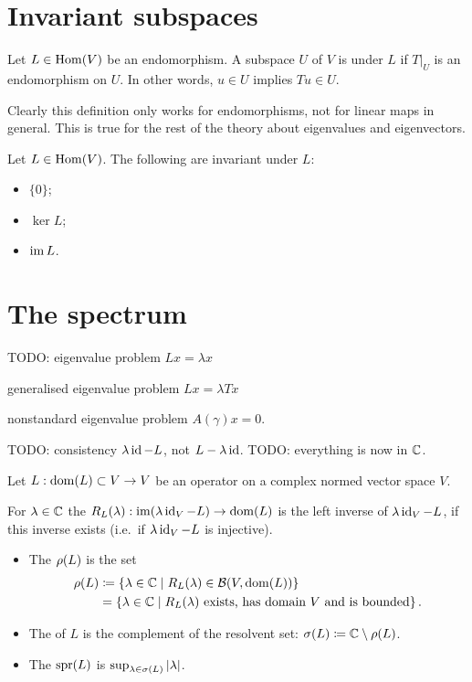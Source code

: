 \section{Invariant subspaces}
\begin{definition}
Let $L\in \operatorname{Hom}(V)$ be an endomorphism. A subspace $U$ of $V$ is  under $L$ if $T|_U$ is an endomorphism on $U$. In other words, $u\in U$ implies $Tu\in U$.
\end{definition}
Clearly this definition only works for endomorphisms, not for linear maps in general. This is true for the rest of the theory about eigenvalues and eigenvectors.
\begin{example}
Let $L\in \operatorname{Hom}(V)$. The following are invariant under $L$:
\begin{itemize}
\item $\{0\}$;
\item $\ker L$;
\item $\operatorname{im} L$.
\end{itemize}
\end{example}

\section{The spectrum}
TODO: eigenvalue problem $Lx = \lambda x$

generalised eigenvalue problem $Lx = \lambda T x$

nonstandard eigenvalue problem $A(\gamma)x = 0$.

TODO: consistency $\lambda \operatorname{id} - L$, not $L-\lambda \operatorname{id}$.
TODO: everything is now in $\mathbb{C}$.

\begin{definition}
Let $L: \operatorname{dom}(L)\subset V \to V$ be an operator on a complex normed vector space $V$.

For $\lambda\in\mathbb{C}$ the  $R_L(\lambda): \operatorname{im}(\lambda \operatorname{id}_V - L)\to\operatorname{dom}(L)$ is the left inverse of $\lambda \operatorname{id}_V - L$, if this inverse exists (i.e.\ if $\lambda \operatorname{id}_V - L$ is injective).
\begin{itemize}
\item The  $\rho(L)$ is the set
\begin{align*}
\rho(L) &\coloneqq \left\{ \lambda\in \mathbb{C} \;\middle|\; R_L(\lambda)\in\operatorname{\mathcal{B}}(V, \operatorname{dom}(L)) \right\} \\
&= \left\{ \lambda\in \mathbb{C} \;\middle|\; \text{$R_L(\lambda)$ exists, has domain $V$ and is bounded} \right\}.
\end{align*}
\item The  of $L$ is the complement of the resolvent set: $\sigma(L) \coloneqq \mathbb{C}\setminus\rho(L)$.
\item The  $\operatorname{spr}(L)$ is $\sup_{\lambda\in\sigma(L)} |\lambda|$.
\end{itemize}
\end{definition}

